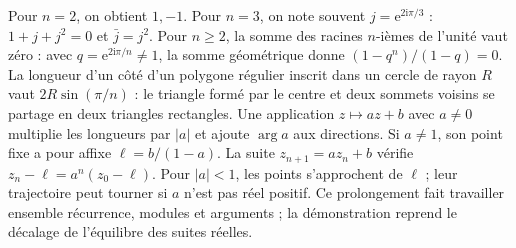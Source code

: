 Pour $n=2$, on obtient $1,-1$. Pour $n=3$, on note souvent $j=\mathrm e^{2\mathrm i\pi/3}$ : $1+j+j^2=0$ et $\bar j=j^2$.
Pour $n\geq2$, la somme des racines $n$-ièmes de l'unité vaut zéro : avec $q=\mathrm e^{2\mathrm i\pi/n}\ne1$, la somme géométrique donne $(1-q^n)/(1-q)=0$.
La longueur d'un côté d'un polygone régulier inscrit dans un cercle de rayon $R$ vaut $2R\sin(\pi/n)$ : le triangle formé par le centre et deux sommets voisins se partage en deux triangles rectangles.
Une application $z\mapsto az+b$ avec $a\ne0$ multiplie les longueurs par $|a|$ et ajoute $\arg a$ aux directions. Si $a\ne1$, son point fixe a pour affixe $\ell=b/(1-a)$.
La suite $z_{n+1}=az_n+b$ vérifie $z_n-\ell=a^n(z_0-\ell)$.
Pour $|a|<1$, les points s'approchent de $\ell$ ; leur trajectoire peut tourner si $a$ n'est pas réel positif.
Ce prolongement fait travailler ensemble récurrence, modules et arguments ; la démonstration reprend le décalage de l'équilibre des suites réelles.

